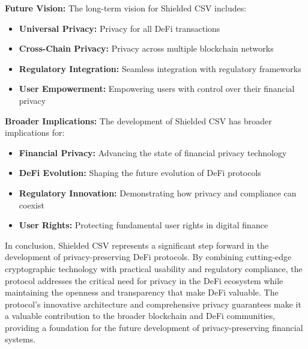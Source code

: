 \documentclass[11pt,a4paper]{article}
\begin{document}
\textbf{Future Vision:}
The long-term vision for Shielded CSV includes:
\begin{itemize}
    \item \textbf{Universal Privacy:} Privacy for all DeFi transactions
    \item \textbf{Cross-Chain Privacy:} Privacy across multiple blockchain networks
    \item \textbf{Regulatory Integration:} Seamless integration with regulatory frameworks
    \item \textbf{User Empowerment:} Empowering users with control over their financial privacy
\end{itemize}

\textbf{Broader Implications:}
The development of Shielded CSV has broader implications for:
\begin{itemize}
    \item \textbf{Financial Privacy:} Advancing the state of financial privacy technology
    \item \textbf{DeFi Evolution:} Shaping the future evolution of DeFi protocols
    \item \textbf{Regulatory Innovation:} Demonstrating how privacy and compliance can coexist
    \item \textbf{User Rights:} Protecting fundamental user rights in digital finance
\end{itemize}

In conclusion, Shielded CSV represents a significant step forward in the development of privacy-preserving DeFi protocols. By combining cutting-edge cryptographic technology with practical usability and regulatory compliance, the protocol addresses the critical need for privacy in the DeFi ecosystem while maintaining the openness and transparency that make DeFi valuable. The protocol's innovative architecture and comprehensive privacy guarantees make it a valuable contribution to the broader blockchain and DeFi communities, providing a foundation for the future development of privacy-preserving financial systems.
\end{document}
